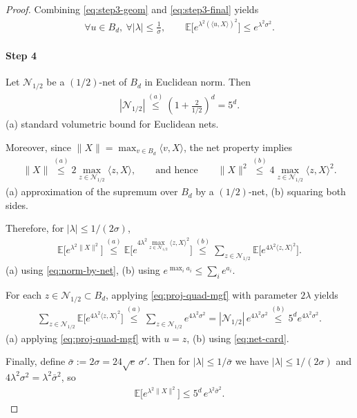 \documentclass[10pt]{article}
\begin{document}
\begin{proof}
Combining \eqref{eq:step3-geom} and \eqref{eq:step3-final} yields
\begin{align}
\forall u\in B_d,\ \forall |\lambda|\le \frac{1}{\sigma},\qquad
\mathbb{E}\big[e^{\lambda^2(\langle u,X\rangle)^2}\big]\le e^{\lambda^2\sigma^2}.
\label{eq:proj-quad-mgf}
\end{align}


\paragraph{Step 4}
Let $\mathcal{N}_{1/2}$ be a $(1/2)$-net of $B_d$ in Euclidean norm. Then
\begin{align}
|\mathcal{N}_{1/2}|
\overset{(a)}{\le}
\left(1+\frac{2}{1/2}\right)^d
=
5^d .
\label{eq:net-card}
\end{align}
(a)\; standard volumetric bound for Euclidean nets.

Moreover, since $\|X\|=\max_{v\in B_d} \langle v,X\rangle$, the net property implies
\begin{align}
\|X\|
\overset{(a)}{\le}
2\max_{z\in \mathcal{N}_{1/2}} \langle z,X\rangle,
\qquad\text{and hence}\qquad
\|X\|^2
\overset{(b)}{\le}
4\max_{z\in \mathcal{N}_{1/2}} \langle z,X\rangle^2 .
\label{eq:norm-by-net}
\end{align}
(a)\; approximation of the supremum over $B_d$ by a $(1/2)$-net,
(b)\; squaring both sides.

Therefore, for $|\lambda|\le 1/(2\sigma)$,
\begin{align}
\mathbb{E}\big[e^{\lambda^2\|X\|^2}\big]
\overset{(a)}{\le}
\mathbb{E}\Big[e^{4\lambda^2 \max_{z\in\mathcal{N}_{1/2}}\langle z,X\rangle^2}\Big]
\overset{(b)}{\le}
\sum_{z\in\mathcal{N}_{1/2}}
\mathbb{E}\big[e^{4\lambda^2 \langle z,X\rangle^2}\big].
\label{eq:step4-union}
\end{align}
(a)\; using \eqref{eq:norm-by-net},
(b)\; using $e^{\max_i a_i}\le \sum_i e^{a_i}$.

For each $z\in\mathcal{N}_{1/2}\subset B_d$, applying \eqref{eq:proj-quad-mgf}
with parameter $2\lambda$ yields
\begin{align}
\sum_{z\in\mathcal{N}_{1/2}}
\mathbb{E}\big[e^{4\lambda^2 \langle z,X\rangle^2}\big]
\overset{(a)}{\le}
\sum_{z\in\mathcal{N}_{1/2}} e^{4\lambda^2\sigma^2}
=
|\mathcal{N}_{1/2}|\,e^{4\lambda^2\sigma^2}
\overset{(b)}{\le}
5^d e^{4\lambda^2\sigma^2}.
\label{eq:step4-sum}
\end{align}
(a)\; applying \eqref{eq:proj-quad-mgf} with $u=z$,
(b)\; using \eqref{eq:net-card}.

Finally, define $\bar{\sigma}:=2\sigma=24\sqrt{e}\,\sigma'$. Then for $|\lambda|\le 1/\bar{\sigma}$
we have $|\lambda|\le 1/(2\sigma)$ and $4\lambda^2\sigma^2=\lambda^2\bar{\sigma}^2$, so
\begin{align}
\mathbb{E}\big[e^{\lambda^2\|X\|^2}\big]
\le
5^d\,e^{\lambda^2\bar{\sigma}^2}.
\label{eq:step4-final}
\end{align}

\end{proof}
\end{document}

